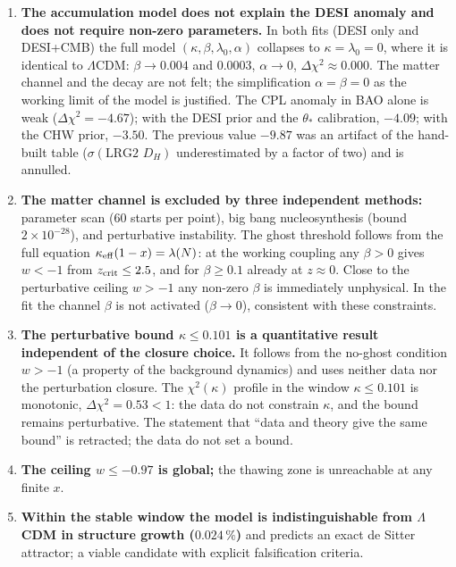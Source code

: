 \documentclass[11pt,a4paper]{article}
\begin{document}
\begin{enumerate}
\item \textbf{The accumulation model does not explain the DESI anomaly and does not require non-zero parameters.} In both fits (DESI only and DESI+CMB) the full model $(\kappa,\beta,\lambda_0,\alpha)$ collapses to $\kappa=\lambda_0=0$, where it is identical to $\Lambda$CDM: $\beta\to0.004$ and $0.0003$, $\alpha\to0$, $\Delta\chi^2\approx0.000$. The matter channel and the decay are not felt; the simplification $\alpha=\beta=0$ as the working limit of the model is justified. The CPL anomaly in BAO alone is weak ($\Delta\chi^2=-4.67$); with the DESI prior and the $\theta_*$ calibration, $-4.09$; with the CHW prior, $-3.50$. The previous value $-9.87$ was an artifact of the hand-built table ($\sigma(\text{LRG2 }D_H)$ underestimated by a factor of two) and is annulled.

\item \textbf{The matter channel is excluded by three independent methods:} parameter scan (60 starts per point), big bang nucleosynthesis (bound $2\times10^{-28}$), and perturbative instability. The ghost threshold follows from the full equation $\kappa_{\rm eff}(1-x)=\lambda(N)$: at the working coupling any $\beta>0$ gives $w<-1$ from $z_{\rm crit}\le2.5$, and for $\beta\ge0.1$ already at $z\approx0$. Close to the perturbative ceiling $w>-1$ any non-zero $\beta$ is immediately unphysical. In the fit the channel $\beta$ is not activated ($\beta\to0$), consistent with these constraints.

\item \textbf{The perturbative bound $\kappa\le0.101$ is a quantitative result independent of the closure choice.} It follows from the no-ghost condition $w>-1$ (a property of the background dynamics) and uses neither data nor the perturbation closure. The $\chi^2(\kappa)$ profile in the window $\kappa\le0.101$ is monotonic, $\Delta\chi^2=0.53<1$: the data do not constrain $\kappa$, and the bound remains perturbative. The statement that ``data and theory give the same bound'' is retracted; the data do not set a bound.

\item \textbf{The ceiling $w\le-0.97$ is global;} the thawing zone is unreachable at any finite $x$.

\item \textbf{Within the stable window the model is indistinguishable from $\Lambda$CDM in structure growth ($0.024\,\%$)} and predicts an exact de Sitter attractor; a viable candidate with explicit falsification criteria.
\end{enumerate}
\end{document}
